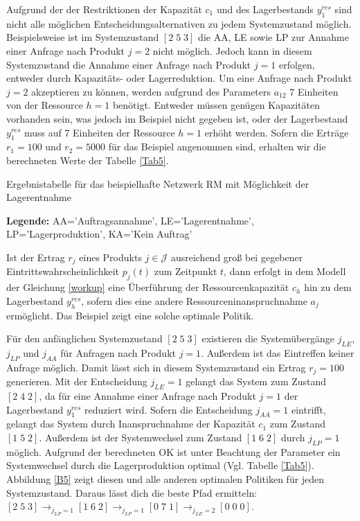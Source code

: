 Aufgrund der der Restriktionen der Kapazität $c_{1}$ und des Lagerbestands $y_{1}^{res}$ sind nicht alle möglichen Entscheidungsalternativen zu jedem Systemzustand möglich. Beispielsweise ist im Systemzustand $[2\;5\;3]$ die AA, LE sowie LP zur Annahme einer Anfrage nach Produkt $j=2$ nicht möglich. Jedoch kann in diesem Systemzustand die Annahme einer Anfrage nach Produkt $j=1$ erfolgen, entweder durch Kapazitäts- oder Lagerreduktion. Um eine Anfrage nach Produkt $j=2$ akzeptieren zu können, werden aufgrund des Parameters $a_{12}$ 7 Einheiten von der Ressource $h=1$ benötigt. Entweder müssen genügen Kapazitäten vorhanden sein, was jedoch im Beispiel nicht gegeben ist, oder der Lagerbestand $y_{1}^{res}$ muss auf 7 Einheiten der Ressource $h=1$ erhöht werden. Sofern die Erträge $r_{1}=100$ und $r_{2}=5000$ für das Beispiel angenommen sind, erhalten wir die berechneten Werte der Tabelle \ref{Tab5}.
\begin{table}
\begin{footnotesize}
    \caption{Ergebnistabelle für das beispielhafte Netzwerk RM mit Möglichkeit der Lagerentnahme} \label{Tab5}
    \vspace*{3mm}
    \begin{center}
      {\footnotesize \textbf{Legende:} AA='Auftragsannahme', LE='Lagerentnahme', LP='Lagerproduktion', KA='Kein Auftrag'} 
      \end{center}
\end{footnotesize}
\end{table}

Ist der Ertrag $r_{j}$ eines Produkts $j\in\mathcal{J}$ ausreichend groß bei gegebener Eintrittswahrscheinlichkeit $p_{j}(t)$ zum Zeitpunkt $t$, dann erfolgt in dem Modell der Gleichung \eqref{workup} eine Überführung der Ressourcenkapazität $c_{h}$ hin zu dem Lagerbestand $y_{h}^{res}$, sofern dies eine andere Ressourceninanspruchnahme $a_{j}$ ermöglicht. Das Beispiel zeigt eine solche optimale Politik.

Für den anfänglichen Systemzustand $[2\;5\;3]$ existieren die Systemübergänge $j_{LE}$, $j_{LP}$ und $j_{AA}$ für Anfragen nach Produkt $j=1$. Außerdem ist das Eintreffen keiner Anfrage möglich. Damit lässt sich in diesem Systemzustand ein Ertrag $r_{j}=100$ generieren. Mit der Entscheidung $j_{LE}=1$ gelangt das System zum Zustand $[2\;4\;2]$, da für eine Annahme einer Anfrage nach Produkt $j=1$ der Lagerbestand $y_{1}^{res}$ reduziert wird. Sofern die Entscheidung $j_{AA}=1$ eintrifft, gelangt das System durch Inanspruchnahme der Kapazität $c_{1}$ zum Zustand $[1\;5\;2]$. Außerdem ist der Systemwechsel zum Zustand $[1\;6\;2]$ durch $j_{LP}=1$ möglich. Aufgrund der berechneten OK ist unter Beachtung der Parameter ein Systemwechsel durch die Lagerproduktion optimal (Vgl. Tabelle \ref{Tab5}). Abbildung \ref{B5} zeigt diesen und alle anderen optimalen Politiken für jeden Systemzustand. Daraus lässt dich die beste Pfad ermitteln:  $[2\;5\;3] \rightarrow_{j_{LP}=1} [1\;6\;2] \rightarrow_{j_{LP}=1} [0\;7\;1] \rightarrow_{j_{LE}=2} [0\;0\;0]$.

